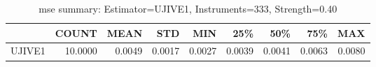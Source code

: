\begin{table}[ht]
\centering
\caption{mse summary: Estimator=UJIVE1, Instruments=333, Strength=0.40}
\begin{tabular}{lrrrrrrrr}
\toprule
 & COUNT & MEAN & STD & MIN & 25\% & 50\% & 75\% & MAX \\
\midrule
UJIVE1 & 10.0000 & 0.0049 & 0.0017 & 0.0027 & 0.0039 & 0.0041 & 0.0063 & 0.0080 \\
\bottomrule
\end{tabular}
\end{table}
